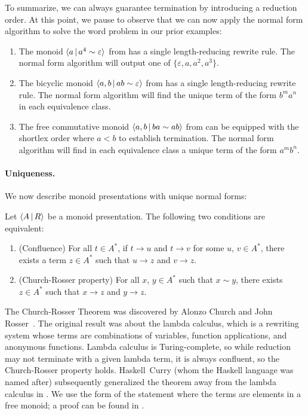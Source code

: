\documentclass[../generics]{subfiles}
\begin{document}
To summarize, we can always guarantee termination by introducing a reduction order. At this point, we pause to observe that we can now apply the normal form algorithm to solve the word problem in our prior examples:
\begin{enumerate}
\item The monoid $\langle a\,|\,a^4\sim\varepsilon\rangle$ from  has a single length-reducing rewrite rule. The normal form algorithm will output one of $\{\varepsilon,a,a^2,a^3\}$.
\item The bicyclic monoid $\langle a, b\,|\,ab\sim\varepsilon\rangle$ from  has a single length-reducing rewrite rule. The normal form algorithm will find the unique term of the form $b^m a^n$ in each equivalence class.
\item The free commutative monoid $\langle a,b\,|\,ba\sim ab\rangle$ from  can be equipped with the shortlex order where $a<b$ to establish termination. The normal form algorithm will find in each equivalence class a unique term of the form $a^m b^n$.
\end{enumerate}

\paragraph{Uniqueness.}
We now describe monoid presentations with unique normal forms:

\begin{theorem}\label{church rosser theorem}
Let $\langle A\,|\,R\rangle$ be a monoid presentation. The following two conditions are equivalent:
\begin{enumerate}
\item {}(Confluence) For all $t\in A^*$, if $t\rightarrow u$ and $t\rightarrow v$ for some $u$, $v\in A^*$, there exists a term $z\in A^*$ such that $u\rightarrow z$ and $v\rightarrow z$.
\item {}(Church-Rosser property) For all $x$, $y\in A^*$ such that $x\sim y$, there exists $z\in A^*$ such that $x\rightarrow z$ and $y\rightarrow z$.
\end{enumerate}
\end{theorem}

The Church-Rosser Theorem was discovered by Alonzo Church and John Rosser~\cite{conversion}. The original result was about the lambda calculus, which is a rewriting system whose terms are combinations of variables, function applications, and anonymous functions. Lambda calculus is Turing-complete, so while reduction may not terminate with a given lambda term, it is always confluent, so the Church-Rosser property holds. Haskell~Curry (whom the Haskell language was named after) subsequently generalized the theorem away from the lambda calculus in \cite{combinatory}. We use the form of the statement where the terms are elements in a free monoid; a proof can be found in \cite{book2012string}.
\end{document}
